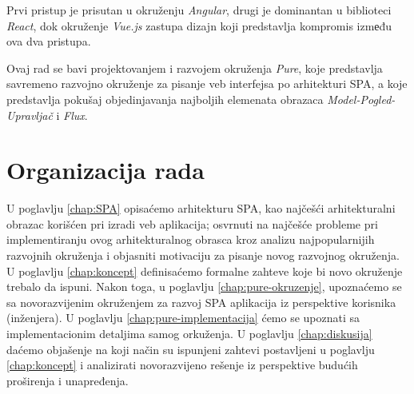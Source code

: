 \documentclass[12pt,oneside]{memoir}
\begin{document}
Prvi pristup je prisutan u okruženju \emph{Angular}, drugi je dominantan u biblioteci 
\emph{React}, dok okruženje \emph{Vue.js} zastupa dizajn koji predstavlja kompromis izmеđu ova dva pristupa.

Ovaj rad se bavi projektovanjem i razvojem okruženja \emph{Pure}, koje predstavlja
savremeno razvojno okruženje za pisanje veb interfejsa po arhitekturi SPA, a koje 
predstavlja pokušaj objedinjavanja najboljih elemenata obrazaca \emph{Model-Pogled-Upravljač} i \emph{Flux}.
\section{Organizacija rada}
U poglavlju \ref{chap:SPA} opisaćemo arhitekturu SPA, kao najčešći arhitekturalni obrazac korišćen pri
izradi veb aplikacija; osvrnuti na najčešće probleme pri implementiranju ovog arhitekturalnog obrasca kroz analizu
najpopularnijih razvojnih okruženja i objasniti motivaciju
za pisanje novog razvojnog okruženja. U poglavlju \ref{chap:koncept} definisaćemo formalne zahteve koje bi novo okruženje
trebalo da ispuni.
Nakon toga, u poglavlju \ref{chap:pure-okruzenje}, upoznaćemo se sa novorazvijenim okruženjem za razvoj SPA aplikacija iz perspektive korisnika (inženjera).
U poglavlju \ref{chap:pure-implementacija} ćemo se upoznati sa implementacionim detaljima samog orkuženja.
U poglavlju \ref{chap:diskusija} daćemo objašenje na koji način su ispunjeni zahtevi postavljeni u poglavlju \ref{chap:koncept}
i analizirati novorazvijeno rešenje iz perspektive budućih proširenja i unapređenja.






\end{document}
